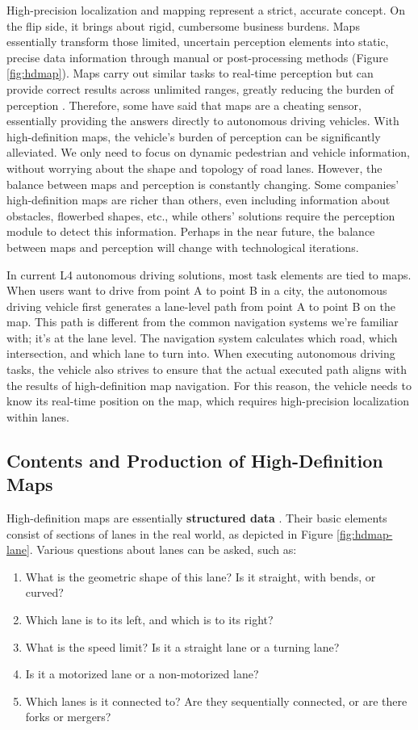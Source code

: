 High-precision localization and mapping represent a strict, accurate concept. On the flip side, it brings about rigid, cumbersome business burdens. Maps essentially transform those limited, uncertain perception elements into static, precise data information through manual or post-processing methods (Figure \ref{fig:hdmap}). Maps carry out similar tasks to real-time perception but can provide correct results across unlimited ranges, greatly reducing the burden of perception \cite{Seif2016}. Therefore, some have said that maps are a cheating sensor, essentially providing the answers directly to autonomous driving vehicles. With high-definition maps, the vehicle's burden of perception can be significantly alleviated. We only need to focus on dynamic pedestrian and vehicle information, without worrying about the shape and topology of road lanes. However, the balance between maps and perception is constantly changing. Some companies' high-definition maps are richer than others, even including information about obstacles, flowerbed shapes, etc., while others' solutions require the perception module to detect this information. Perhaps in the near future, the balance between maps and perception will change with technological iterations.

In current L4 autonomous driving solutions, most task elements are tied to maps. When users want to drive from point A to point B in a city, the autonomous driving vehicle first generates a lane-level path from point A to point B on the map. This path is different from the common navigation systems we're familiar with; it's at the lane level. The navigation system calculates which road, which intersection, and which lane to turn into. When executing autonomous driving tasks, the vehicle also strives to ensure that the actual executed path aligns with the results of high-definition map navigation. For this reason, the vehicle needs to know its real-time position on the map, which requires high-precision localization within lanes.

\subsection{Contents and Production of High-Definition Maps}

High-definition maps are essentially \textbf{structured data} \cite{Zhou2021}. Their basic elements consist of sections of lanes in the real world, as depicted in Figure \ref{fig:hdmap-lane}. Various questions about lanes can be asked, such as:
\begin{enumerate}
	\item What is the geometric shape of this lane? Is it straight, with bends, or curved?
	\item Which lane is to its left, and which is to its right?
	\item What is the speed limit? Is it a straight lane or a turning lane?
	\item Is it a motorized lane or a non-motorized lane?
	\item Which lanes is it connected to? Are they sequentially connected, or are there forks or mergers?
\end{enumerate}

